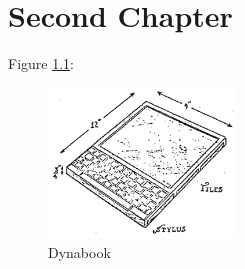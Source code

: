 \chapter{Second Chapter}


\lipsum

Figure \ref{fig:dynabook}:

\begin{figure}[h]
\begin{centering}
\includegraphics[width=5cm]{assets/images/Dynabook}
\par\end{centering}
\caption{Dynabook \label{fig:dynabook}}
\end{figure}